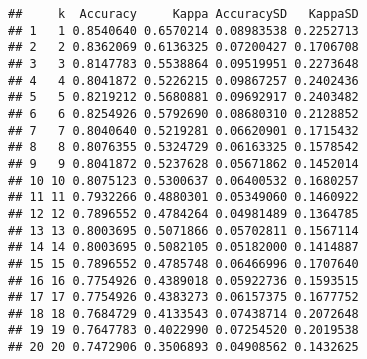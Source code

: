 \documentclass[]{article}
\newenvironment{Shaded}{\begin{snugshade}}{\end{snugshade}}
\newcommand{\CommentTok}[1]{\textcolor[rgb]{0.56,0.35,0.01}{\textit{#1}}}
\newcommand{\DataTypeTok}[1]{\textcolor[rgb]{0.13,0.29,0.53}{#1}}
\newcommand{\DecValTok}[1]{\textcolor[rgb]{0.00,0.00,0.81}{#1}}
\newcommand{\KeywordTok}[1]{\textcolor[rgb]{0.13,0.29,0.53}{\textbf{#1}}}
\newcommand{\NormalTok}[1]{#1}
\newcommand{\OperatorTok}[1]{\textcolor[rgb]{0.81,0.36,0.00}{\textbf{#1}}}
\newcommand{\OtherTok}[1]{\textcolor[rgb]{0.56,0.35,0.01}{#1}}
\newcommand{\StringTok}[1]{\textcolor[rgb]{0.31,0.60,0.02}{#1}}
\begin{document}
\begin{Shaded}
\end{Shaded}

\begin{verbatim}
##     k  Accuracy     Kappa AccuracySD   KappaSD
## 1   1 0.8540640 0.6570214 0.08983538 0.2252713
## 2   2 0.8362069 0.6136325 0.07200427 0.1706708
## 3   3 0.8147783 0.5538864 0.09519951 0.2273648
## 4   4 0.8041872 0.5226215 0.09867257 0.2402436
## 5   5 0.8219212 0.5680881 0.09692917 0.2403482
## 6   6 0.8254926 0.5792690 0.08680310 0.2128852
## 7   7 0.8040640 0.5219281 0.06620901 0.1715432
## 8   8 0.8076355 0.5324729 0.06163325 0.1578542
## 9   9 0.8041872 0.5237628 0.05671862 0.1452014
## 10 10 0.8075123 0.5300637 0.06400532 0.1680257
## 11 11 0.7932266 0.4880301 0.05349060 0.1460922
## 12 12 0.7896552 0.4784264 0.04981489 0.1364785
## 13 13 0.8003695 0.5071866 0.05702811 0.1567114
## 14 14 0.8003695 0.5082105 0.05182000 0.1414887
## 15 15 0.7896552 0.4785748 0.06466996 0.1707640
## 16 16 0.7754926 0.4389018 0.05922736 0.1593515
## 17 17 0.7754926 0.4383273 0.06157375 0.1677752
## 18 18 0.7684729 0.4133543 0.07438714 0.2072648
## 19 19 0.7647783 0.4022990 0.07254520 0.2019538
## 20 20 0.7472906 0.3506893 0.04908562 0.1432625
\end{verbatim}
\end{document}
